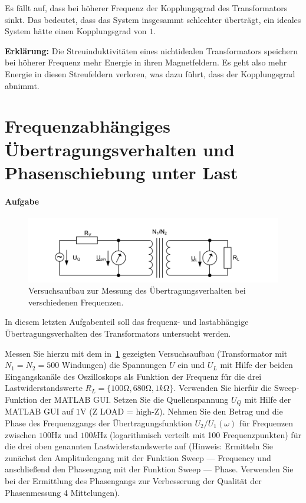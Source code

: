 \documentclass[10pt]{scrreprt}
\begin{document}
        Es fällt auf, dass bei höherer Frequenz der Kopplungsgrad des Transformators
        sinkt. Das bedeutet, dass das System insgesammt schlechter überträgt, ein
        ideales System hätte einen Kopplungsgrad von $1$.

        \textbf{Erklärung:}
        Die Streuinduktivitäten eines nichtidealen Transformators speichern bei höherer
        Frequenz mehr Energie in ihren Magnetfeldern. Es geht also mehr Energie in diesen
        Streufeldern verloren, was dazu führt, dass der Kopplungsgrad abnimmt.


        \section{Frequenzabhängiges Übertragungsverhalten und Phasenschiebung unter Last}
        \paragraph{Aufgabe}
        \begin{center}
            \begin{figure}[H]
                \includegraphics[width=\textwidth]{aufgabenBilder/abbildung12.png}
                \caption{Versuchsaufbau zur Messung des Übertragungsverhalten bei verschiedenen Frequenzen.}
                \label{fig:abb12}
            \end{figure}
        \end{center}

        In diesem letzten Aufgabenteil soll das frequenz- und lastabhängige Übertragungsverhalten
        des Transformators untersucht werden.

        \vspace{0.5cm}

        Messen Sie hierzu mit dem in~\ref{fig:abb12} gezeigten Versuchsaufbau (Transformator mit
        $N_1 = N_2 = 500$ Windungen) die Spannungen $U$ ein und $U_L$ mit Hilfe der beiden Eingangskanäle
        des Oszilloskops als Funktion der Frequenz für die drei Lastwiderstandswerte
        $R_L = \{100\si{\ohm}, 680 \si{\ohm}, 1 \si{k\ohm}\}$. Verwenden Sie hierfür die Sweep-Funktion der MATLAB GUI.
        Setzen Sie die Quellenspannung $U_Q$ mit Hilfe der MATLAB GUI auf $1\si{\volt}$ (Z LOAD = high-Z).
        Nehmen Sie den Betrag und die Phase des Frequenzgangs der Übertragungsfunktion
        $U_2 /U_1 (\omega)$ für Frequenzen zwischen $100\si{\hertz}$ und $100\si{k\hertz}$ (logarithmisch verteilt mit 100
        Frequenzpunkten) für die drei oben genannten Lastwiderstandswerte auf (Hinweis:
        Ermitteln Sie zunächst den Amplitudengang mit der Funktion \glqq{}Sweep --- Frequency\grqq{} und
        anschließend den Phasengang mit der Funktion \glqq{}Sweep --- Phase\grqq{}. Verwenden Sie bei der
        Ermittlung des Phasengangs zur Verbesserung der Qualität der Phasenmessung 4 Mittelungen).
\end{document}
